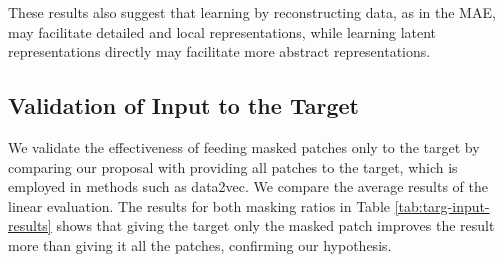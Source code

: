 \documentclass{article}
\begin{document}
These results also suggest that learning by reconstructing data, as in the MAE, may facilitate detailed and local representations, while learning latent representations directly may facilitate more abstract representations.



\subsection{Validation of Input to the Target} \label{exp:target-input}
We validate the effectiveness of feeding masked patches only to the target by comparing our proposal with providing all patches to the target, which is employed in methods such as data2vec\cite{baevski2022data2vec}. We compare the average results of the linear evaluation.
The results for both masking ratios in Table \ref{tab:targ-input-results} shows that giving the target only the masked patch improves the result more than giving it all the patches, confirming our hypothesis.

\begin{table}[htb!]
\vspace{-12pt}
\caption{Linear evaluation average results (\%) for target inputs.}
\label{tab:targ-input-results}
\centering
{}
\vspace{-15pt}
\end{table}
\end{document}
